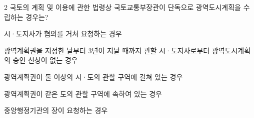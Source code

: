 \begin{question}{2}
국토의 계획 및 이용에 관한 법령상 국토교통부장관이 단독으로 광역도시계획을 수립하는 경우는?
\begin{choices}
  \item 시·도지사가 협의를 거쳐 요청하는 경우
  \item 광역계획권을 지정한 날부터 3년이 지날 때까지 관할 시·도지사로부터 광역도시계획의 승인 신청이 없는 경우
  \item 광역계획권이 둘 이상의 시·도의 관할 구역에 걸쳐 있는 경우
  \item 광역계획권이 같은 도의 관할 구역에 속하여 있는 경우
  \item 중앙행정기관의 장이 요청하는 경우
\end{choices}
\end{question}
